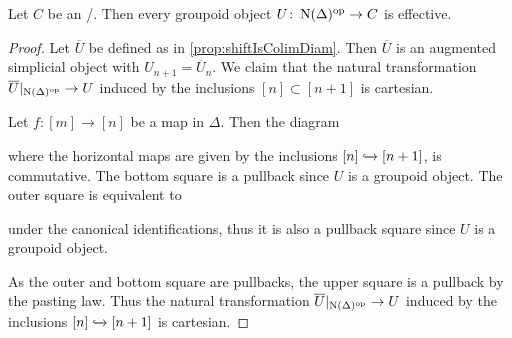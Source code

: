 \begin{prop}\label{prop:groupoidObjInToposAreEffective}
    Let $C$ be an \inftytop/.
    Then every groupoid object $U\colon\operatorname{N}(\Delta)^{\operatorname{op}}\to C$ is effective.
    \begin{proof}
        Let $\overline{U}$ be defined as in \cref{prop:shiftIsColimDiam}.
        Then $\overline{U}$ is an augmented simplicial object with $U_{n+1}=\overline{U}_n$.
        We claim that the natural transformation $\overline{U}|_{\operatorname{N}(\Delta)^{\operatorname{op}}}\to U$ induced by the inclusions $[n]\subset[n+1]$ is cartesian.
        
        Let $f\colon [m]\to[n]$ be a map in $\Delta$. 
        Then the diagram
        \begin{center}
        \end{center}
        where the horizontal maps are given by the inclusions $[n]\xhookrightarrow{}[n+1]$, is commutative. 
        The bottom square is a pullback since $U$ is a groupoid object.
        The outer square is equivalent to
        \begin{center}
        \end{center}
        under the canonical identifications, thus it is also a pullback square since $U$ is a groupoid object.
        
        As the outer and bottom square are pullbacks, the upper square is a pullback by the pasting law.
        Thus the natural transformation $\overline{U}|_{\operatorname{N}(\Delta)^{\operatorname{op}}}\to U$ induced by the inclusions $[n]\xhookrightarrow{}[n+1]$ is cartesian.


\end{proof}
\end{prop}
